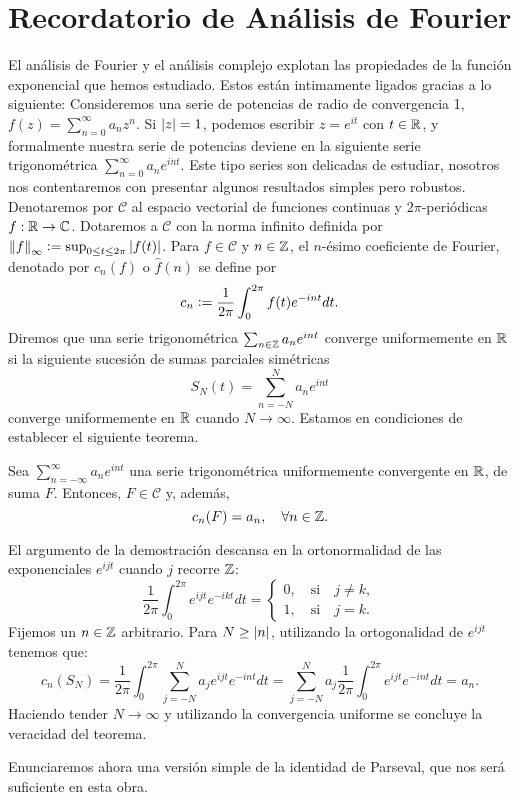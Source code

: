 \section{Recordatorio de Análisis de Fourier}
El análisis de Fourier y el análisis complejo explotan las propiedades de la función 
exponencial que hemos estudiado. Estos están intimamente ligados gracias a lo siguiente:
Consideremos una serie de potencias de radio de convergencia 1, \(f(z) = \sum_{n=0}^{\infty} a_nz^n\).
Si \(\left\lvert z\right\rvert = 1\), podemos escribir \(z = e^{it}\) con \(t\in \mathbb{R}\), y formalmente nuestra serie de 
potencias deviene en la siguiente serie trigonométrica \(\sum_{n=0}^{\infty}a_ne^{int}\). Este tipo 
series son delicadas de estudiar, nosotros nos contentaremos con presentar algunos resultados simples
pero robustos. Denotaremos por \(\mathcal{C}\) al espacio vectorial de funciones continuas y 
\(2\pi\)-periódicas \(f: \mathbb{R} \to \mathbb{C} \). Dotaremos a \(\mathcal{C}\) con la norma infinito definida por
\(\left\lVert f\right\rVert_{\infty} \vcentcolon = \sup_{0\leq t \leq 2\pi} \left\lvert f(t)\right\rvert \). Para \(f \in \mathcal{C}\) y 
\(n\in \mathbb{Z}\), el \(n\)-ésimo coeficiente de Fourier, denotado por \(c_n(f)\) o \(\hat{f}(n)\) se define
por 
\[
c_n \vcentcolon = \frac{1}{2\pi} \int_{0}^{2\pi} f(t) e^{-int} dt.
\]
Diremos que una serie trigonométrica \(\sum_{n\in \mathbb{Z}} a_ne^{int}\) converge uniformemente en \(\mathbb{R}\) si
la siguiente sucesión de sumas parciales simétricas
\[
S_N(t) = \sum_{n=-N}^{N} a_ne^{int}
\]
converge uniformemente en \(\mathbb{R}\) cuando \(N \to \infty\). Estamos en condiciones de establecer el siguiente
teorema.

\begin{theo}\label{teo-series-Fourier}
    Sea \(\sum_{n=-\infty}^{\infty}a_ne^{int}\) una serie trigonométrica uniformemente convergente en \(\mathbb{R}\),
    de suma \(F\). Entonces, \(F \in \mathcal{C}\) y, además,
    \[
    c_n(F) = a_n, \quad \forall n\in \mathbb{Z}.
    \]
\end{theo}
\begin{dem}
    El argumento de la demostración descansa en la ortonormalidad de las exponenciales \(e^{ijt}\) cuando 
    \(j\) recorre \(\mathbb{Z}\):
    \[
    \frac{1}{2\pi} \int_{0}^{2\pi} e^{ijt}e^{-ikt} dt = 
        \begin{cases}
        0, \quad \text{si} \quad j\neq k, \\
        1, \quad \text{si} \quad j=k.        
        \end{cases}
    \]
    Fijemos un \(n\in \mathbb{Z}\) arbitrario. Para \(N \geq \left\lvert n\right\rvert\), utilizando la ortogonalidad de \(e^{ijt}\) tenemos que:
    \[
    c_n(S_N) = \frac{1}{2\pi} \int_{0}^{2\pi} \sum_{j=-N}^{N} a_je^{ijt} e^{-int} dt = 
               \sum_{j=-N}^{N} a_j \frac{1}{2\pi} \int_{0}^{2\pi} e^{ijt} e^{-int} dt = a_n.
    \]
    Haciendo tender \(N\to \infty\) y utilizando la convergencia uniforme se concluye la veracidad del teorema.
\end{dem}
Enunciaremos ahora una versión simple de la identidad de Parseval, que nos será suficiente en esta obra.

